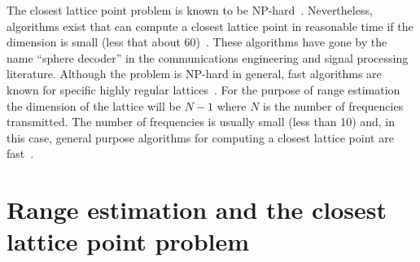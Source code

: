 \documentclass[10pt,twocolumn,twoside]{IEEEtran}
\begin{document}
The closest lattice point problem is known to be NP-hard~\cite{micciancio_hardness_2001, Jalden2005_sphere_decoding_complexity}. Nevertheless, algorithms exist that can compute a closest lattice point in reasonable time if the dimension is small (less that about 60)~\cite{Kannan1987_fast_general_np,schnorr_euchner_sd_1994,Viterbo_sphere_decoder_1999,Agrell2002,MicciancioVoulgaris_deterministic_jv_2013}.  These algorithms have gone by the name ``sphere decoder'' in the communications engineering and signal processing literature. 
Although the problem is NP-hard in general, fast algorithms are known for specific highly regular lattices~\cite{McKilliam2009CoxeterLattices,McKilliam_closest_point_lattice_first_kind_2014}. For the purpose of range estimation the dimension of the lattice will be $N-1$ where $N$ is the number of frequencies transmitted.  The number of frequencies is usually small (less than 10) and, in this case, general purpose algorithms for computing a closest lattice point are fast~\cite{Agrell2002}. 


\section{Range estimation and the closest lattice point problem} \label{sec:range-estim-clos}
\end{document}

